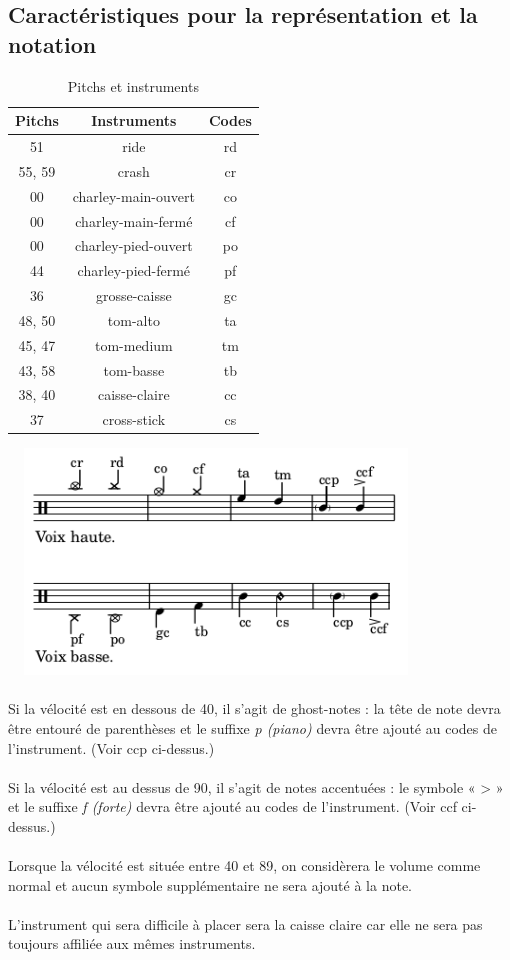 \subsection{Caractéristiques pour la représentation et la notation}

\begin{table}[h]
	\centering
	\begin{tabular}{|c|c|c|} \hline
		Pitchs & Instruments & Codes \\ \hline
		51 & ride & rd \\
		55, 59 & crash & cr \\
		00 & charley-main-ouvert & co \\
		00 & charley-main-fermé & cf \\
		00 & charley-pied-ouvert & po \\
		44 & charley-pied-fermé & pf \\
		36 & grosse-caisse & gc \\
		48, 50 & tom-alto & ta \\
		45, 47 & tom-medium & tm \\
		43, 58 & tom-basse & tb \\
		38, 40 & caisse-claire & cc \\
		37 & cross-stick & cs \\ \hline
	\end{tabular}
	\caption{Pitchs et instruments}
\end{table}
\includegraphics[height=60mm, width=110mm]{images/notation/description_notation.png}\\\\
Si la vélocité est en dessous de 40, il s’agit de ghost-notes : la tête de note devra être entouré de parenthèses et le suffixe \textit{p (piano)} devra être ajouté au codes de l’instrument. (Voir ccp ci-dessus.)\\\\
Si la vélocité est au dessus de 90, il s’agit de notes accentuées : le symbole « > » et le suffixe \textit{f (forte)} devra être ajouté au codes de l’instrument. (Voir ccf ci-dessus.)\\\\
Lorsque la vélocité est située entre 40 et 89, on considèrera le volume comme normal et aucun symbole supplémentaire ne sera ajouté à la note.\\\\
L’instrument qui sera difficile à placer sera la caisse claire car elle ne sera pas toujours affiliée aux mêmes instruments.
